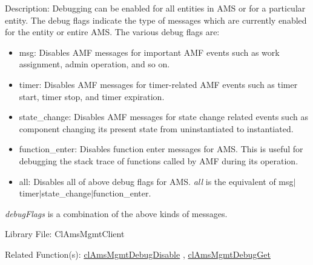 \begin{Desc}
\item[Description:]Debugging can be enabled for all entities in AMS or for a particular entity. The debug flags indicate the type of messages which are currently enabled for the entity or entire AMS. The various debug flags are: \begin{itemize}
\item msg: Disables AMF messages for important AMF events such as work assignment, admin operation, and so on. \item timer: Disables AMF messages for timer-related AMF events such as timer start, timer stop, and timer expiration. \item state\_\-change: Disables AMF messages for state change related events such as component changing its present state from uninstantiated to instantiated. \item function\_\-enter: Disables function enter messages for AMS. This is useful for debugging the stack trace of functions called by AMF during its operation. \item all: Disables all of above debug flags for AMS. {\em all\/} is the equivalent of msg$|$timer$|$state\_\-change$|$function\_\-enter.\end{itemize}
{\em debug\-Flags\/} is a combination of the above kinds of messages.\end{Desc}
\begin{Desc}
\item[Library File:]Cl\-Ams\-Mgmt\-Client\end{Desc}
\begin{Desc}
\item[Related Function(s):]\hyperlink{pageams126}{cl\-Ams\-Mgmt\-Debug\-Disable} , \hyperlink{pageams127}{cl\-Ams\-Mgmt\-Debug\-Get} \end{Desc}

\newpage
